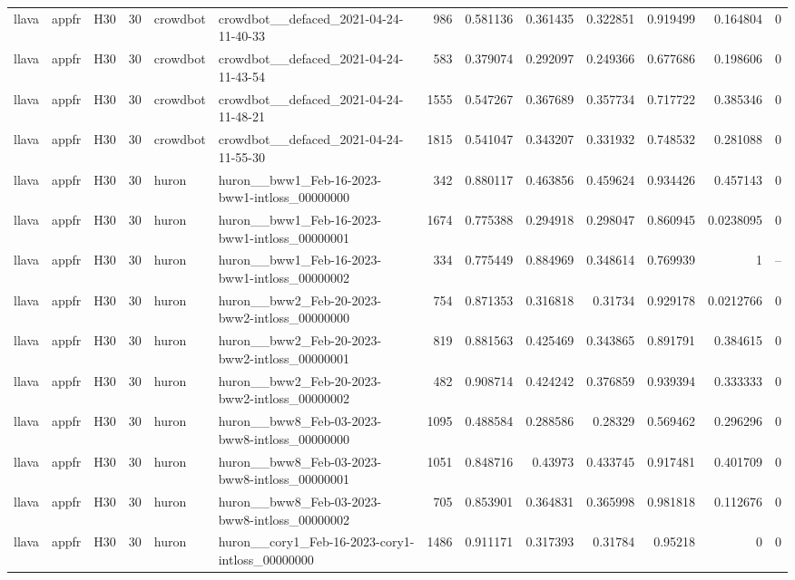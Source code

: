 \begin{longtable}{lllrllrrrrrrr}
llava & appfr & H30 & 30 & crowdbot & crowdbot\_\_defaced\_2021-04-24-11-40-33 & 986 & 0.581136 & 0.361435 & 0.322851 & 0.919499 & 0.164804 & 0 \\
llava & appfr & H30 & 30 & crowdbot & crowdbot\_\_defaced\_2021-04-24-11-43-54 & 583 & 0.379074 & 0.292097 & 0.249366 & 0.677686 & 0.198606 & 0 \\
llava & appfr & H30 & 30 & crowdbot & crowdbot\_\_defaced\_2021-04-24-11-48-21 & 1555 & 0.547267 & 0.367689 & 0.357734 & 0.717722 & 0.385346 & 0 \\
llava & appfr & H30 & 30 & crowdbot & crowdbot\_\_defaced\_2021-04-24-11-55-30 & 1815 & 0.541047 & 0.343207 & 0.331932 & 0.748532 & 0.281088 & 0 \\
llava & appfr & H30 & 30 & huron & huron\_\_bww1\_Feb-16-2023-bww1-intloss\_00000000 & 342 & 0.880117 & 0.463856 & 0.459624 & 0.934426 & 0.457143 & 0 \\
llava & appfr & H30 & 30 & huron & huron\_\_bww1\_Feb-16-2023-bww1-intloss\_00000001 & 1674 & 0.775388 & 0.294918 & 0.298047 & 0.860945 & 0.0238095 & 0 \\
llava & appfr & H30 & 30 & huron & huron\_\_bww1\_Feb-16-2023-bww1-intloss\_00000002 & 334 & 0.775449 & 0.884969 & 0.348614 & 0.769939 & 1 & -- \\
llava & appfr & H30 & 30 & huron & huron\_\_bww2\_Feb-20-2023-bww2-intloss\_00000000 & 754 & 0.871353 & 0.316818 & 0.31734 & 0.929178 & 0.0212766 & 0 \\
llava & appfr & H30 & 30 & huron & huron\_\_bww2\_Feb-20-2023-bww2-intloss\_00000001 & 819 & 0.881563 & 0.425469 & 0.343865 & 0.891791 & 0.384615 & 0 \\
llava & appfr & H30 & 30 & huron & huron\_\_bww2\_Feb-20-2023-bww2-intloss\_00000002 & 482 & 0.908714 & 0.424242 & 0.376859 & 0.939394 & 0.333333 & 0 \\
llava & appfr & H30 & 30 & huron & huron\_\_bww8\_Feb-03-2023-bww8-intloss\_00000000 & 1095 & 0.488584 & 0.288586 & 0.28329 & 0.569462 & 0.296296 & 0 \\
llava & appfr & H30 & 30 & huron & huron\_\_bww8\_Feb-03-2023-bww8-intloss\_00000001 & 1051 & 0.848716 & 0.43973 & 0.433745 & 0.917481 & 0.401709 & 0 \\
llava & appfr & H30 & 30 & huron & huron\_\_bww8\_Feb-03-2023-bww8-intloss\_00000002 & 705 & 0.853901 & 0.364831 & 0.365998 & 0.981818 & 0.112676 & 0 \\
llava & appfr & H30 & 30 & huron & huron\_\_cory1\_Feb-16-2023-cory1-intloss\_00000000 & 1486 & 0.911171 & 0.317393 & 0.31784 & 0.95218 & 0 & 0 \\

\end{longtable}
